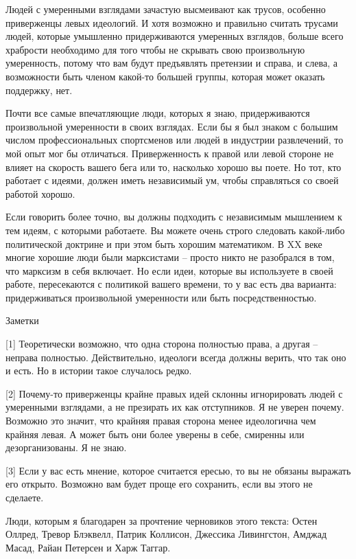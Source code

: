 \documentclass[ebook,12pt,oneside,openany]{memoir}
\begin{document}
Людей с умеренными взглядами зачастую высмеивают как трусов, особенно
приверженцы левых идеологий. И хотя возможно и правильно считать
трусами людей, которые умышленно придерживаются умеренных взглядов,
больше всего храбрости необходимо для того чтобы не скрывать свою
произвольную умеренность, потому что вам будут предъявлять претензии и
справа, и слева, а возможности быть членом какой-то большей группы,
которая может оказать поддержку, нет.

Почти все самые впечатляющие люди, которых я знаю, придерживаются
произвольной умеренности в своих взглядах. Если бы я был знаком с
большим числом профессиональных спортсменов или людей в индустрии
развлечений, то мой опыт мог бы отличаться. Приверженность к правой
или левой стороне не влияет на скорость вашего бега или то, насколько
хорошо вы поете. Но тот, кто работает с идеями, должен иметь
независимый ум, чтобы справляться со своей работой хорошо.

Если говорить более точно, вы должны подходить с независимым мышлением
к тем идеям, с которыми работаете. Вы можете очень строго следовать
какой-либо политической доктрине и при этом быть хорошим математиком.
В XX веке многие хорошие люди были марксистами – просто никто не
разобрался в том, что марксизм в себя включает. Но если идеи, которые
вы используете в своей работе, пересекаются с политикой вашего
времени, то у вас есть два варианта: придерживаться произвольной
умеренности или быть посредственностью.

Заметки

[1] Теоретически возможно, что одна сторона полностью права, а другая
– неправа полностью. Действительно, идеологи всегда должны верить, что
так оно и есть. Но в истории такое случалось редко.

[2] Почему-то приверженцы крайне правых идей склонны игнорировать
людей с умеренными взглядами, а не презирать их как отступников. Я не
уверен почему. Возможно это значит, что крайняя правая сторона менее
идеологична чем крайняя левая. А может быть они более уверены в себе,
смиренны или дезорганизованы. Я не знаю.

[3] Если у вас есть мнение, которое считается ересью, то вы не обязаны
выражать его открыто. Возможно вам будет проще его сохранить, если вы
этого не сделаете.

Люди, которым я благодарен за прочтение черновиков этого текста: Остен
Оллред, Тревор Блэквелл, Патрик Коллисон, Джессика Ливингстон, Амджад
Масад, Райан Петерсен и Харж Таггар.
\end{document}
